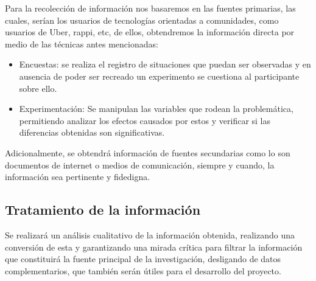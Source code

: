 	{Para la recolección de información nos basaremos en las fuentes primarias, las cuales, serían los usuarios de tecnologías orientadas a comunidades, como usuarios de Uber, rappi, etc, de ellos, obtendremos la información directa por medio de las técnicas antes mencionadas:
		
	\begin{itemize}
		\item Encuestas: se realiza el registro de situaciones que puedan ser observadas y en ausencia de poder ser recreado un experimento se cuestiona al participante sobre ello.
		
		\item Experimentación: Se manipulan las variables que rodean la problemática, permitiendo analizar los efectos causados por estos y verificar si las diferencias obtenidas son significativas.
	\end{itemize}
		
	Adicionalmente, se obtendrá información de fuentes secundarias como lo son documentos de internet o medios de comunicación, siempre y cuando, la información sea pertinente y fidedigna.}
	
	\subsection{Tratamiento de la información}
	
	{Se realizará un análisis cualitativo de la información obtenida, realizando una conversión de esta y garantizando una mirada crítica para filtrar la información que constituirá la fuente principal de la investigación, desligando de datos complementarios, que también serán útiles para el desarrollo del proyecto.}